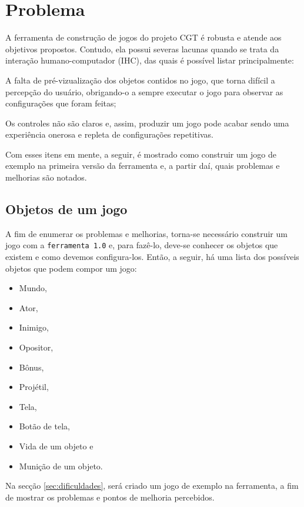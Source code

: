 \documentclass[12pt,twoside,openright,a4paper,english,brazil,sumario=tradicional]{abntex2}
\begin{document}
\chapter{Problema}
\label{chap:problemas}
A ferramenta de construção de jogos do projeto CGT é robusta e atende aos objetivos propostos. Contudo, ela possui severas lacunas quando se trata da interação humano-computador (IHC), das quais é possível listar principalmente:

\begin{alineas}
	\item A falta de pré-vizualização dos objetos contidos no jogo, que torna difícil a percepção do usuário, obrigando-o a sempre executar o jogo para observar as configurações que foram feitas;
	\item Os controles não são claros e, assim, produzir um jogo pode acabar sendo uma experiência onerosa e repleta de configurações repetitivas.
\end{alineas}

Com esses itens em mente, a seguir, é mostrado como construir um jogo de exemplo na primeira versão da ferramenta e, a partir daí, quais problemas e melhorias são notados.

\section{Objetos de um jogo}
\label{sec:objetos}

A fim de enumerar os problemas e melhorias, torna-se necessário construir um jogo com a \texttt{ferramenta 1.0} e, para fazê-lo, deve-se conhecer os objetos que existem e como devemos configura-los. Então, a seguir, há uma lista dos possíveis objetos que podem compor um jogo:

\begin{itemize}
	\item Mundo,
	\item Ator,
	\item Inimigo,
	\item Opositor,
	\item Bônus,
	\item Projétil,
	\item Tela,
	\item Botão de tela,
	\item Vida de um objeto e
	\item Munição de um objeto.
\end{itemize}

Na secção \ref{sec:dificuldades}, será criado um jogo de exemplo na ferramenta, a fim de mostrar os problemas e pontos de melhoria percebidos.
\end{document}
